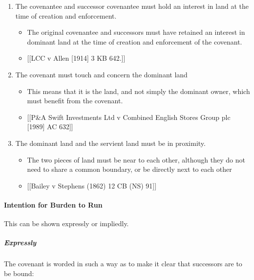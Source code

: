 \documentclass[
]{article}
\providecommand{\tightlist}{%
  \setlength{\itemsep}{0pt}\setlength{\parskip}{0pt}}
\begin{document}
\begin{enumerate}
\def\labelenumi{\arabic{enumi}.}
\tightlist
\item
  The covenantee and successor covenantee must hold an interest in land
  at the time of creation and enforcement.

  \begin{itemize}
  \tightlist
  \item
    The original covenantee and successors must have retained an
    interest in dominant land at the time of creation and enforcement of
    the covenant.
  \item
    {[}{[}LCC v Allen {[}1914{]} 3 KB 642.{]}{]}
  \end{itemize}
\item
  The covenant must touch and concern the dominant land

  \begin{itemize}
  \tightlist
  \item
    This means that it is the land, and not simply the dominant owner,
    which must benefit from the covenant.
  \item
    {[}{[}P\&A Swift Investments Ltd v Combined English Stores Group plc
    {[}1989{]} AC 632{]}{]}
  \end{itemize}
\item
  The dominant land and the servient land must be in proximity.

  \begin{itemize}
  \tightlist
  \item
    The two pieces of land must be near to each other, although they do
    not need to share a common boundary, or be directly next to each
    other
  \item
    {[}{[}Bailey v Stephens (1862) 12 CB (NS) 91{]}{]}
  \end{itemize}
\end{enumerate}

\hypertarget{intention-for-burden-to-run}{%
\paragraph{Intention for Burden to
Run}\label{intention-for-burden-to-run}}

This can be shown expressly or impliedly.

\hypertarget{expressly}{%
\subparagraph{Expressly}\label{expressly}}

The covenant is worded in such a way as to make it clear that successors
are to be bound:
\end{document}
